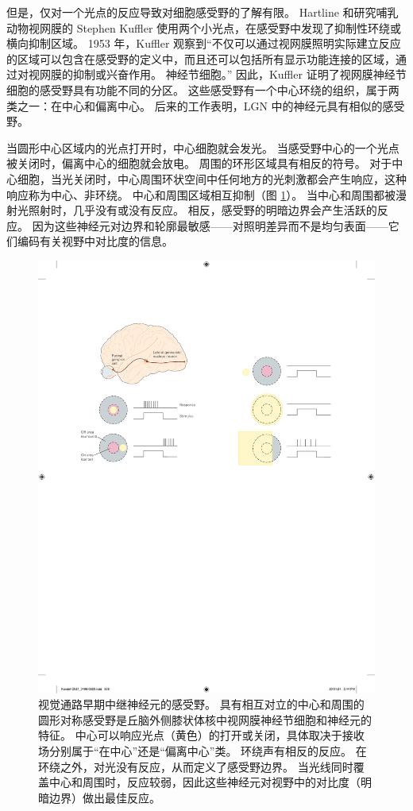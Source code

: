 但是，仅对一个光点的反应导致对细胞感受野的了解有限。 
Hartline 和研究哺乳动物视网膜的 Stephen Kuffler 使用两个小光点，在感受野中发现了抑制性环绕或横向抑制区域。 
1953 年，Kuffler 观察到“不仅可以通过视网膜照明实际建立反应的区域可以包含在感受野的定义中，而且还可以包括所有显示功能连接的区域，通过对视网膜的抑制或兴奋作用。 
神经节细胞。” 因此，Kuffler 证明了视网膜神经节细胞的感受野具有功能不同的分区。 
这些感受野有一个中心环绕的组织，属于两类之一：在中心和偏离中心。 后来的工作表明，LGN 中的神经元具有相似的感受野。


当圆形中心区域内的光点打开时，中心细胞就会发光。 
当感受野中心的一个光点被关闭时，偏离中心的细胞就会放电。 
周围的环形区域具有相反的符号。 
对于中心细胞，当光关闭时，中心周围环状空间中任何地方的光刺激都会产生响应，这种响应称为中心、非环绕。 
中心和周围区域相互抑制（图 \ref{fig:21_9}）。 
当中心和周围都被漫射光照射时，几乎没有或没有反应。 
相反，感受野的明暗边界会产生活跃的反应。 
因为这些神经元对边界和轮廓最敏感——对照明差异而不是均匀表面——它们编码有关视野中对比度的信息。

\begin{figure}[htbp]
	\centering
	\includegraphics[width=1.0\linewidth]{chap21/fig_21_9}
	\caption{视觉通路早期中继神经元的感受野。 
		具有相互对立的中心和周围的圆形对称感受野是丘脑外侧膝状体核中视网膜神经节细胞和神经元的特征。 
		中心可以响应光点（黄色）的打开或关闭，具体取决于接收场分别属于“在中心”还是“偏离中心”类。 
		环绕声有相反的反应。 
		在环绕之外，对光没有反应，从而定义了感受野边界。 
		当光线同时覆盖中心和周围时，反应较弱，因此这些神经元对视野中的对比度（明暗边界）做出最佳反应。}
	\label{fig:21_9}
\end{figure}


